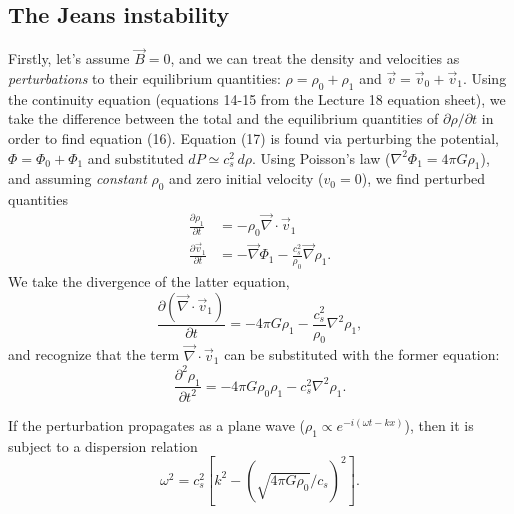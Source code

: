 \documentclass{tufte-handout}
\begin{document}
\subsection{The Jeans instability}
Firstly, let's assume $\vec B = 0$, and we can treat the density and velocities as \textit{perturbations} to their equilibrium quantities: $\rho = \rho_0 + \rho_1$ and $\vec v = \vec v_0 + \vec v_1$. Using the continuity equation (equations 14-15 from the Lecture 18 equation sheet), we take the difference between the total and the equilibrium quantities of $\partial \rho/\partial t$ in order to find equation (16). Equation (17) is found via perturbing the potential, $\Phi = \Phi_0 + \Phi_1$ and substituted $dP \simeq c_s^2\, d\rho$. Using Poisson's law ($\nabla^2 \Phi_1 = 4\pi G\rho_1$), and assuming \textit{constant} $\rho_0$ and zero initial velocity ($v_0 = 0$), we find perturbed quantities
\begin{align*}
\frac{\partial \rho_1}{\partial t} &= -\rho_0 \vec \nabla \cdot \vec v_1\\
\frac{\partial \vec v_1}{\partial t} &= -\vec\nabla\Phi_1 - \frac{c_s^2}{\rho_0}\vec \nabla\rho_1.
\end{align*}
We take the divergence of the latter equation,
\begin{equation}
\frac{\partial (\vec \nabla\cdot \vec v_1)}{\partial t} = -4\pi G\rho_1 - \frac{c_s^2}{\rho_0}\nabla^2\rho_1,
\end{equation}
and recognize that the term $\vec\nabla \cdot \vec v_1$ can be substituted with the former equation:
\begin{equation}
\frac{\partial^2 \rho_1}{\partial t^2}= -4\pi G\rho_0 \rho_1 - c_s^2\nabla^2\rho_1.
\end{equation}

If the perturbation propagates as a plane wave ($\rho_1 \propto e^{-i(\omega t - kx)}$), then it is subject to a dispersion relation
\begin{equation}
\omega^2 = c_s^2 \left [k^2 - \left (\sqrt{4\pi G\rho_0}/c_s\right )^2\right ].
\end{equation}
\end{document}

